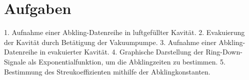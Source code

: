 \section{Aufgaben}

1. Aufnahme einer Abkling-Datenreihe in luftgefüllter Kavität.
2. Evakuierung der Kavität durch Betätigung der Vakuumpumpe.
3. Aufnahme einer Abkling-Datenreihe in evakuierter Kavität.
4. Graphische Darstellung der Ring-Down-Signale als Exponentialfunktion, um die Abklingzeiten zu bestimmen.
5. Bestimmung des Streukoeffizienten mithilfe der Abklingkonstanten.